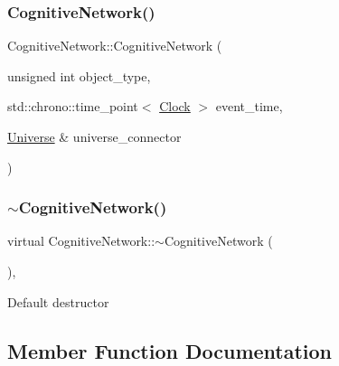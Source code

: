 \subsubsection{\texorpdfstring{Cognitive\+Network()}{CognitiveNetwork()}\hspace{0.1cm}{\footnotesize\ttfamily [4/4]}}
{\footnotesize\ttfamily Cognitive\+Network\+::\+Cognitive\+Network (\begin{DoxyParamCaption}\item[{unsigned int}]{object\+\_\+type,  }\item[{std\+::chrono\+::time\+\_\+point$<$ \mbox{\hyperlink{universe_8h_a0ef8d951d1ca5ab3cfaf7ab4c7a6fd80}{Clock}} $>$}]{event\+\_\+time,  }\item[{\mbox{\hyperlink{classUniverse}{Universe}} \&}]{universe\+\_\+connector }\end{DoxyParamCaption})\hspace{0.3cm}{\ttfamily [inline]}}

\mbox{\label{classCognitiveNetwork_a17142cc6f0bb3894e63f6c66fa401778}} 
\subsubsection{\texorpdfstring{$\sim$\+Cognitive\+Network()}{~CognitiveNetwork()}}
{\footnotesize\ttfamily virtual Cognitive\+Network\+::$\sim$\+Cognitive\+Network (\begin{DoxyParamCaption}{ }\end{DoxyParamCaption})\hspace{0.3cm}{\ttfamily [inline]}, {\ttfamily [virtual]}}

Default destructor 

\subsection{Member Function Documentation}
\mbox{\label{classCognitiveNetwork_a6af57693982286ac6a6831ca3010b760}} 
